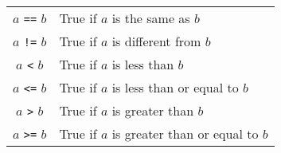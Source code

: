 \begin{center}
  \begin{tabular}{cl}
    $a$ \texttt{==} $b$ & True if $a$ is the same as $b$ \\
    $a$ \texttt{!=} $b$ & True if $a$ is different from $b$ \\
    $a$ \texttt{<} $b$ & True if $a$ is less than $b$ \\
    $a$ \texttt{<=} $b$ & True if $a$ is less than or equal to $b$ \\
    $a$ \texttt{>} $b$ & True if $a$ is greater than $b$ \\
    $a$ \texttt{>=} $b$ & True if $a$ is greater than or equal to $b$ \\
  \end{tabular}
\end{center}
